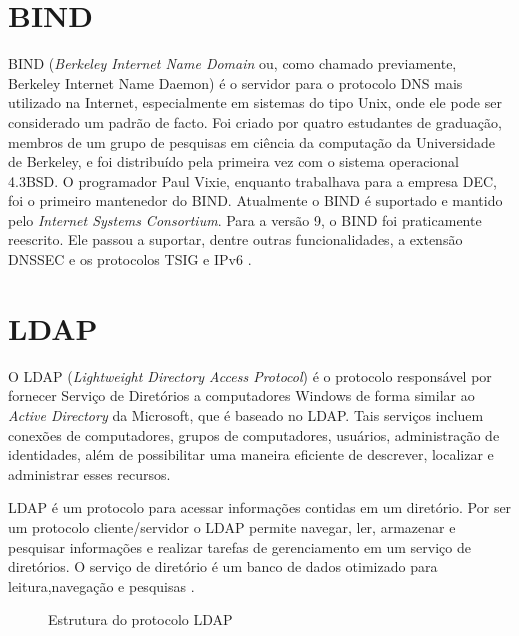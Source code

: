\section{BIND}


BIND (\textit{Berkeley Internet Name Domain} ou, como chamado previamente, Berkeley Internet Name Daemon) é o servidor para o protocolo DNS mais utilizado na Internet, especialmente em sistemas do tipo Unix, onde ele pode ser considerado um padrão de facto. Foi criado por quatro estudantes de graduação, membros de um grupo de pesquisas em ciência da computação da Universidade de Berkeley, e foi distribuído pela primeira vez com o sistema operacional 4.3BSD. O programador Paul Vixie, enquanto trabalhava para a empresa DEC, foi o primeiro mantenedor do BIND. Atualmente o BIND é suportado e mantido pelo \textit{Internet Systems Consortium}.
Para a versão 9, o BIND foi praticamente reescrito. Ele passou a suportar, dentre outras funcionalidades, a extensão DNSSEC e os protocolos TSIG e IPv6 \cite{BIND}.

\section{LDAP}

O LDAP (\textit{Lightweight Directory Access Protocol}) é o protocolo responsável por fornecer Serviço de Diretórios a computadores Windows de forma similar ao \textit{Active Directory} da Microsoft, que é baseado no LDAP. Tais serviços incluem conexões de computadores, grupos de computadores, usuários, administração de identidades, além de possibilitar uma maneira eficiente de descrever, localizar e administrar esses recursos.

LDAP é um protocolo para acessar informações contidas em um diretório. Por ser um protocolo cliente/servidor o LDAP permite navegar, ler, armazenar e pesquisar informações e realizar tarefas de gerenciamento em um serviço de diretórios. O serviço de diretório é um banco de dados otimizado para leitura,navegação e pesquisas \cite{TRIGO}.

\begin{figure}[ht]
   	\centering
   	\caption{Estrutura do protocolo LDAP \cite{LDAP}}
    \label{ldap}
\end{figure}

